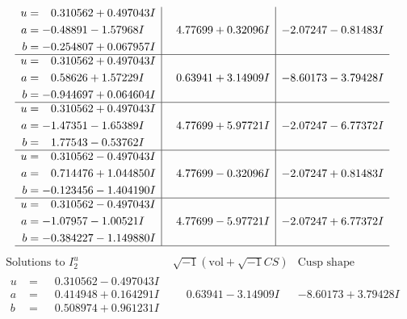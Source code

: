 \documentclass[1p]{elsarticle_modified}
\theoremstyle{definition}
\newcommand{\I}{\sqrt{-1}}
\begin{document}
$$\begin{array}{c|c|c}
\begin{aligned}
u &= \phantom{-}0.310562 + 0.497043 I \\
a &= -0.48891 - 1.57968 I \\
b &= -0.254807 + 0.067957 I\end{aligned}
 & \phantom{-}4.77699 + 0.32096 I & -2.07247 - 0.81483 I \\ \hline\begin{aligned}
u &= \phantom{-}0.310562 + 0.497043 I \\
a &= \phantom{-}0.58626 + 1.57229 I \\
b &= -0.944697 + 0.064604 I\end{aligned}
 & \phantom{-}0.63941 + 3.14909 I & -8.60173 - 3.79428 I \\ \hline\begin{aligned}
u &= \phantom{-}0.310562 + 0.497043 I \\
a &= -1.47351 - 1.65389 I \\
b &= \phantom{-}1.77543 - 0.53762 I\end{aligned}
 & \phantom{-}4.77699 + 5.97721 I & -2.07247 - 6.77372 I \\ \hline\begin{aligned}
u &= \phantom{-}0.310562 - 0.497043 I \\
a &= \phantom{-}0.714476 + 1.044850 I \\
b &= -0.123456 - 1.404190 I\end{aligned}
 & \phantom{-}4.77699 - 0.32096 I & -2.07247 + 0.81483 I \\ \hline\begin{aligned}
u &= \phantom{-}0.310562 - 0.497043 I \\
a &= -1.07957 - 1.00521 I \\
b &= -0.384227 - 1.149880 I\end{aligned}
 & \phantom{-}4.77699 - 5.97721 I & -2.07247 + 6.77372 I\\
 \hline 
 \end{array}$$\newpage$$\begin{array}{c|c|c}  
\text{Solutions to }I^u_{2}& \I (\text{vol} + \sqrt{-1}CS) & \text{Cusp shape}\\
 \hline 
\begin{aligned}
u &= \phantom{-}0.310562 - 0.497043 I \\
a &= \phantom{-}0.414948 + 0.164291 I \\
b &= \phantom{-}0.508974 + 0.961231 I\end{aligned}
 & \phantom{-}0.63941 - 3.14909 I & -8.60173 + 3.79428 I \\ \hline\begin{aligned}

\end{aligned}
\end{array}$$
\end{document}
